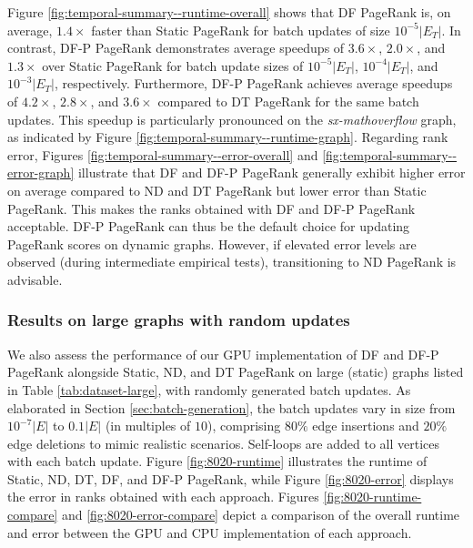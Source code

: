 Figure \ref{fig:temporal-summary--runtime-overall} shows that DF PageRank is, on average, $1.4\times$ faster than Static PageRank for batch updates of size $10^{-5}|E_T|$. In contrast, DF-P PageRank demonstrates average speedups of $3.6\times$, $2.0\times$, and $1.3\times$ over Static PageRank for batch update sizes of $10^{-5}|E_T|$, $10^{-4}|E_T|$, and $10^{-3}|E_T|$, respectively. Furthermore, DF-P PageRank achieves average speedups of $4.2\times$, $2.8\times$, and $3.6\times$ compared to DT PageRank for the same batch updates. This speedup is particularly pronounced on the \textit{sx-mathoverflow} graph, as indicated by Figure \ref{fig:temporal-summary--runtime-graph}. Regarding rank error, Figures \ref{fig:temporal-summary--error-overall} and \ref{fig:temporal-summary--error-graph} illustrate that DF and DF-P PageRank generally exhibit higher error on average compared to ND and DT PageRank but lower error than Static PageRank. This makes the ranks obtained with DF and DF-P PageRank acceptable. DF-P PageRank can thus be the default choice for updating PageRank scores on dynamic graphs. However, if elevated error levels are observed (during intermediate empirical tests), transitioning to ND PageRank is advisable.




\subsubsection{Results on large graphs with random updates}

We also assess the performance of our GPU implementation of DF and DF-P PageRank alongside Static, ND, and DT PageRank on large (static) graphs listed in Table \ref{tab:dataset-large}, with randomly generated batch updates. As elaborated in Section \ref{sec:batch-generation}, the batch updates vary in size from $10^{-7}|E|$ to $0.1|E|$ (in multiples of $10$), comprising $80\%$ edge insertions and $20\%$ edge deletions to mimic realistic scenarios. Self-loops are added to all vertices with each batch update. Figure \ref{fig:8020-runtime} illustrates the runtime of Static, ND, DT, DF, and DF-P PageRank, while Figure \ref{fig:8020-error} displays the error in ranks obtained with each approach. Figures \ref{fig:8020-runtime-compare} and \ref{fig:8020-error-compare} depict a comparison of the overall runtime and error between the GPU and CPU implementation of each approach.

